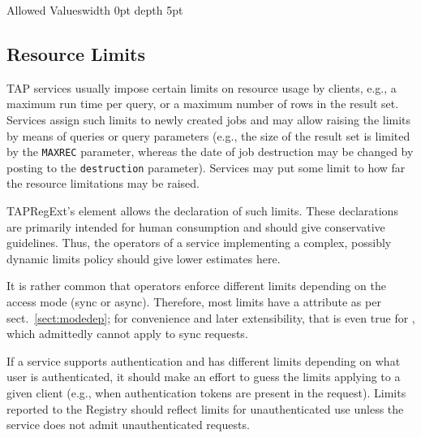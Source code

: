 \documentclass{ivoa}
\begin{document}
\begin{generated}
\begin{bigdescription}
\begin{description}
\item[Allowed Values\vrule width 0pt depth 5pt]\hfil
\end{description}

\end{bigdescription}\endgroup

\endgroup
\end{generated}


\subsection{Resource Limits}

\label{reslimits}

TAP services usually impose certain limits on resource usage by clients,
e.g., a maximum run time per query, or a maximum number of rows in the result
set.  Services assign such limits to newly created jobs and may
allow raising the limits by means of queries or query parameters (e.g., the
size of the result set is limited by the \texttt{MAXREC} parameter, whereas
the date of job destruction may be changed by posting to the
\texttt{destruction} parameter).  Services may put some limit to how
far the resource limitations may be raised.

TAPRegExt's  element allows the declaration of such limits.
These declarations are primarily intended for human consumption and should give
conservative guidelines.  Thus, the operators of a service implementing a
complex, possibly dynamic limits policy should give lower estimates here.

It is rather common that operators enforce different limits depending on
the access mode (sync or async).  Therefore, most limits have a
 attribute as per sect.~\ref{sect:modedep}; for
convenience and later extensibility, that is even true for
, which admittedly cannot apply to sync requests.

If a service supports authentication and has different
limits depending on what user is authenticated, it should make an effort
to guess the limits applying to a given client (e.g., when
authentication tokens are present in the request).  Limits reported to
the Registry should reflect limits for unauthenticated use unless the
service does not admit unauthenticated requests.
\end{document}
